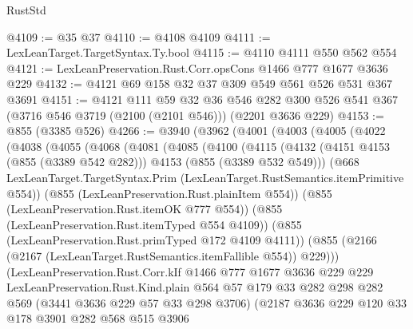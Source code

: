 \begin{lexlean}{RustStd}
\begin{coremodule}
@4109 := @35 @37
@4110 := @4108 @4109
@4111 := LexLeanTarget.TargetSyntax.Ty.bool
@4115 := @4110 @4111 @550 @562 @554
@4121 := LexLeanPreservation.Rust.Corr.opsCons @1466 @777 @1677 @3636 @229
@4132 := @4121 @69 @158 @32 @37 @309 @549 @561 @526 @531 @367 @3691
@4151 := @4121
    @111
    @59
    @32
    @36
    @546
    @282
    @300
    @526
    @541
    @367
    (@3716 @546 @3719 (@2100 (@2101 @546)))
    (@2201 @3636 @229)
@4153 := @855 (@3385 @526)
@4266 := @3940
    (@3962
      (@4001
        (@4003
          (@4005
            (@4022
              (@4038
                (@4055
                  (@4068
                    (@4081
                      (@4085
                        (@4100
                          (@4115
                            (@4132
                              (@4151 @4153 (@855 (@3389 @542 @282)))
                              @4153
                              (@855 (@3389 @532 @549)))
                            (@668
                              LexLeanTarget.TargetSyntax.Prim
                              (LexLeanTarget.RustSemantics.itemPrimitive @554))
                            (@855 (LexLeanPreservation.Rust.plainItem @554))
                            (@855 (LexLeanPreservation.Rust.itemOK @777 @554))
                            (@855 (LexLeanPreservation.Rust.itemTyped @554 @4109))
                            (@855 (LexLeanPreservation.Rust.primTyped @172 @4109 @4111))
                            (@855
                              (@2166 (@2167 (LexLeanTarget.RustSemantics.itemFallible @554)) @229)))
                          (LexLeanPreservation.Rust.Corr.kIf
                            @1466
                            @777
                            @1677
                            @3636
                            @229
                            @229
                            LexLeanPreservation.Rust.Kind.plain
                            @564
                            @57
                            @179
                            @33
                            @282
                            @298
                            @282
                            @569
                            (@3441 @3636 @229 @57 @33 @298 @3706)
                            (@2187
                              @3636
                              @229
                              @120
                              @33
                              @178
                              @3901
                              @282
                              @568
                              @515
                              @3906

\end{coremodule}
\end{lexlean}
